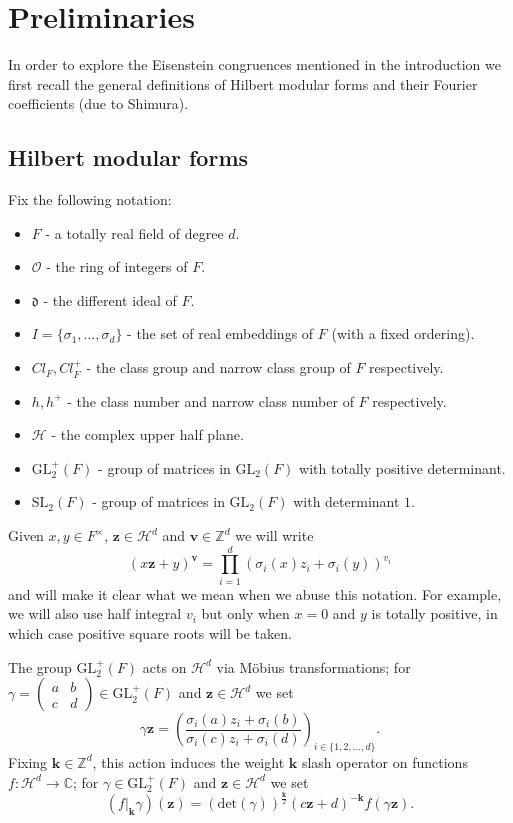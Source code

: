 \documentclass[a4paper,oneside]{amsart}
\theoremstyle{plain}
\theoremstyle{definition}
\begin{document}
\section{Preliminaries}
In order to explore the Eisenstein congruences mentioned in the introduction we first recall the general definitions of Hilbert modular forms and their Fourier coefficients (due to Shimura).

\subsection{Hilbert modular forms}
Fix the following notation:
\begin{itemize}
\item{$F$ - a totally real field of degree $d$.}
\item{$\mathcal{O}$ - the ring of integers of $F$.}
\item{$\mathfrak{d}$ - the different ideal of $F$.}
\item{$I = \{\sigma_1,...,\sigma_d\}$ - the set of real embeddings of $F$ (with a fixed ordering).}
\item{$Cl_F, Cl_{F}^{+}$ - the class group and narrow class group of $F$ respectively.}
\item{$h, h^{+}$ - the class number and narrow class number of $F$ respectively.}
\item{$\mathcal{H}$ - the complex upper half plane.}
\item{$\text{GL}^{+}_2(F)$ - group of matrices in $\text{GL}_2(F)$ with totally positive determinant.}
\item{$\text{SL}_2(F)$ - group of matrices in $\text{GL}_2(F)$ with determinant $1$.}
\end{itemize}

Given $x,y\in F^{\times}$, $\textbf{z}\in\mathcal{H}^d$ and $\textbf{v}\in\mathbb{Z}^d$ we will write \[(x\textbf{z}+y)^{\textbf{v}} = \prod_{i=1}^d(\sigma_i(x)z_i+\sigma_i(y))^{v_i}\] and will make it clear what we mean when we abuse this notation. For example, we will also use half integral $v_i$ but only when $x=0$ and $y$ is totally positive, in which case positive square roots will be taken.

The group $\text{GL}^{+}_2(F)$ acts on $\mathcal{H}^d$ via M\"obius transformations; for $\gamma = \left(\begin{array}{cc}a & b\\ c & d\end{array}\right)\in \text{GL}^{+}_2(F)$ and $\textbf{z}\in\mathcal{H}^d$ we set \[\gamma\textbf{z} = \left(\frac{\sigma_i(a) z_i + \sigma_i(b)}{\sigma_i(c) z_i + \sigma_i(d)}\right)_{i\in\{1,2,...,d\}}.\] Fixing $\textbf{k}\in\mathbb{Z}^d$, this action induces the weight $\textbf{k}$ slash operator on functions $f:\mathcal{H}^d \rightarrow \mathbb{C}$; for $\gamma\in\text{GL}^{+}_2(F)$ and $\textbf{z}\in\mathcal{H}^d$ we set \[(f|_\textbf{k}\gamma)(\textbf{z}) = (\text{det}(\gamma))^{\frac{\textbf{k}}{2}}(c\textbf{z}+d)^{-\textbf{k}}f(\gamma\textbf{z}).\]
\end{document}
